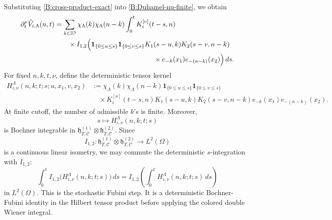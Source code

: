 \documentclass[10pt]{amsart}
\numberwithin{equation}{section}
\theoremstyle{plain}
\theoremstyle{definition}
\theoremstyle{remark}
\newcommand{\Z}{\mathbb{Z}}
\newcommand{\C}{\mathcal{C}}
\begin{document}
Substituting \eqref{B:cross-product-exact} into \eqref{B:Duhamel-nu-finite}, we obtain
\[
\begin{aligned}
        \partial_t^\nu\widehat V_{i,\Lambda}(n,t)
        &=
        \sum_{k\in\Z^3}
        \chi_\Lambda(k)\chi_\Lambda(n-k)
        \int_0^tK_i^{[\nu]}(t-s,n) \\
        &\qquad\times
        I_{1,2}\Bigl(
        \mathbf 1_{\{0\le u\le s\}}
        \mathbf 1_{\{0\le v\le s\}}
        K_1(s-u,k)K_2(s-v,n-k) \\
        &\hspace{5.1cm}\times
        e_{-k}(x_1)e_{-(n-k)}(x_2)
        \Bigr)\,ds.
\end{aligned}
\]
For fixed \(n,k,t,\nu\), define the deterministic tensor kernel
\[
\begin{aligned}
        H_{i,\nu}^{\Lambda}(n,k;t;s;u,x_1,v,x_2)
        &:={}
        \chi_\Lambda(k)\chi_\Lambda(n-k)
        \mathbf 1_{\{0\le u\le s\}}
        \mathbf 1_{\{0\le v\le s\}} \\
        &\quad\times
        K_i^{[\nu]}(t-s,n)K_1(s-u,k)K_2(s-v,n-k)
        e_{-k}(x_1)e_{-(n-k)}(x_2).
\end{aligned}
\]
At finite cutoff, the number of admissible \(k\)'s is finite.  Moreover,
\[
        s\mapsto H_{i,\nu}^{\Lambda}(n,k;t;s)
\]
is Bochner integrable in \(\mathfrak h_{T,\C}^{(1)}\otimes\mathfrak h_{T,\C}^{(2)}\).  Since
\[
        I_{1,2}:\mathfrak h_{T,\C}^{(1)}\otimes\mathfrak h_{T,\C}^{(2)}\longrightarrow L^2(\Omega)
\]
is a continuous linear isometry, we may commute the deterministic \(s\)-integration with \(I_{1,2}\):
\[
        \int_0^tI_{1,2}\bigl(H_{i,\nu}^{\Lambda}(n,k;t;s)\bigr)\,ds
        =
        I_{1,2}\left(\int_0^tH_{i,\nu}^{\Lambda}(n,k;t;s)\,ds\right)
\]
in \(L^2(\Omega)\).  This is the stochastic Fubini step.  It is a deterministic Bochner-Fubini identity in the Hilbert tensor product before applying the colored double Wiener integral.
\end{document}
